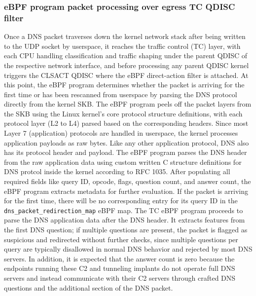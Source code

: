 \documentclass [11pt, proquest] {uwthesis}[2020/02/24]
\begin{document}
\subsubsection{\textbf{eBPF program packet processing over egress TC QDISC filter}}
\label{active:sec1}
Once a DNS packet traverses down the kernel network stack after being written to the UDP socket by userspace, it reaches the traffic control (TC) layer, with each CPU handling classification and traffic shaping under the parent QDISC of the respective network interface, and before processing any parent QDISC kernel triggers the CLSACT QDISC where the eBPF direct-action filter is attached. At this point, the eBPF program determines whether the packet is arriving for the first time or has been rescanned from userspace by parsing the DNS protocol directly from the kernel SKB. The eBPF program peels off the packet layers from the SKB using the Linux kernel’s core protocol structure definitions, with each protocol layer (L2 to L4) parsed based on the corresponding headers. Since most Layer 7 (application) protocols are handled in userspace, the kernel processes application payloads as raw bytes. Like any other application protocol, DNS also has its protocol header and payload. The eBPF program parses the DNS header from the raw application data using custom written C structure definitions for DNS protcol inside the kernel according to RFC 1035. After populating all required fields like query ID, opcode, flags, question count, and answer count, the eBPF program extracts metadata for further evaluation. If the packet is arriving for the first time, there will be no corresponding entry for its query ID in the \texttt{dns\_packet\_redirection\_map} eBPF map. The TC eBPF program proceeds to parse the DNS application data after the DNS header. It extracts features from the first DNS question; if multiple questions are present, the packet is flagged as suspicious and redirected without further checks, since multiple questions per query are typically disallowed in normal DNS behavior and rejected by most DNS servers. In addition, it is expected that the answer count is zero because the endpoints running these C2 and tunneling implants do not operate full DNS servers and instead communicate with their C2 servers through crafted DNS questions and the additional section of the DNS packet.
\end{document}
